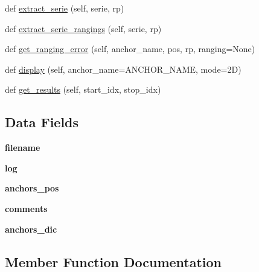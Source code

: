 \begin{DoxyCompactItemize}
\item 
def \mbox{\hyperlink{classread_mes_1_1_measurements_ac792c51cc2fd3ee12f7fe6d4595c853b}{extract\+\_\+serie}} (self, serie, rp)
\item 
def \mbox{\hyperlink{classread_mes_1_1_measurements_a904ca68697f93b5f5aa1794e596e41f2}{extract\+\_\+serie\+\_\+rangings}} (self, serie, rp)
\item 
def \mbox{\hyperlink{classread_mes_1_1_measurements_a4dfb72a3a59bb3616ecc87e769948963}{get\+\_\+ranging\+\_\+error}} (self, anchor\+\_\+name, pos, rp, ranging=None)
\item 
def \mbox{\hyperlink{classread_mes_1_1_measurements_a8793e38aa01d0a08a2c3de87bcaef6ba}{display}} (self, anchor\+\_\+name=A\+N\+C\+H\+O\+R\+\_\+\+N\+A\+ME, mode=\textquotesingle{}2\+D\textquotesingle{})
\item 
def \mbox{\hyperlink{classread_mes_1_1_measurements_a2c700151a5d9c0926dfb4c40064df17a}{get\+\_\+results}} (self, start\+\_\+idx, stop\+\_\+idx)
\end{DoxyCompactItemize}
\subsection*{Data Fields}
\begin{DoxyCompactItemize}
\item 
\mbox{\label{classread_mes_1_1_measurements_a2ff994e16bf9521154de4cf659a3b689}} 
{\bfseries filename}
\item 
\mbox{\label{classread_mes_1_1_measurements_ab09a63eb35b270b5cdbead1983ebdccb}} 
{\bfseries log}
\item 
\mbox{\label{classread_mes_1_1_measurements_a5b68d6d2c91370ca44cee7699a3cb1fd}} 
{\bfseries anchors\+\_\+pos}
\item 
\mbox{\label{classread_mes_1_1_measurements_a64b8b36116751d566275b722e40bb3a7}} 
{\bfseries comments}
\item 
\mbox{\label{classread_mes_1_1_measurements_ac74f5fdcc1c338a24cba634a4f16a1b6}} 
{\bfseries anchors\+\_\+dic}
\end{DoxyCompactItemize}


\subsection{Member Function Documentation}
\mbox{\label{classread_mes_1_1_measurements_a8793e38aa01d0a08a2c3de87bcaef6ba}} 
